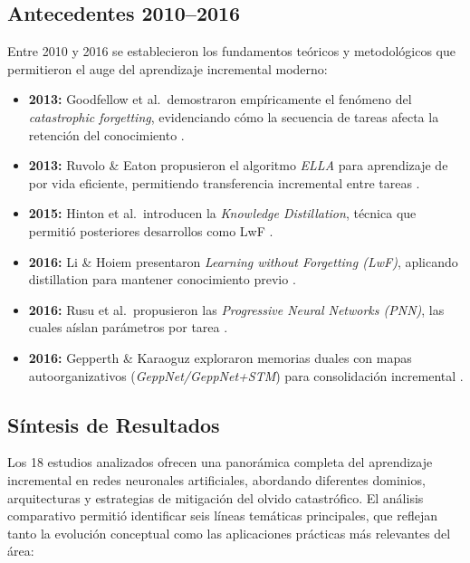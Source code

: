 \documentclass[10pt,a4paper]{article}
\begin{document}
\subsection{Antecedentes 2010–2016}
Entre 2010 y 2016 se establecieron los fundamentos teóricos y metodológicos que permitieron el auge del aprendizaje incremental moderno:
\begin{itemize}
  \item \textbf{2013:} Goodfellow et al.\ demostraron empíricamente el fenómeno del \textit{catastrophic forgetting}, evidenciando cómo la secuencia de tareas afecta la retención del conocimiento \cite{goodfellow2013catastrophic}.
  \item \textbf{2013:} Ruvolo \& Eaton propusieron el algoritmo \textit{ELLA} para aprendizaje de por vida eficiente, permitiendo transferencia incremental entre tareas \cite{ruvolo2013ella}.
  \item \textbf{2015:} Hinton et al.\ introducen la \textit{Knowledge Distillation}, técnica que permitió posteriores desarrollos como LwF \cite{hinton2015distillation}. 
  \item \textbf{2016:} Li \& Hoiem presentaron \textit{Learning without Forgetting (LwF)}, aplicando distillation para mantener conocimiento previo \cite{li2016lwf}.
  \item \textbf{2016:} Rusu et al.\ propusieron las \textit{Progressive Neural Networks (PNN)}, las cuales aíslan parámetros por tarea \cite{rusu2016pnn}.
  \item \textbf{2016:} Gepperth \& Karaoguz exploraron memorias duales con mapas autoorganizativos (\textit{GeppNet/GeppNet+STM}) para consolidación incremental \cite{gepperth2016geppnet}.
\end{itemize}

\subsection{Síntesis de Resultados}
Los 18 estudios analizados ofrecen una panorámica completa del aprendizaje incremental en redes neuronales artificiales, abordando diferentes dominios, arquitecturas y estrategias de mitigación del olvido catastrófico. 
El análisis comparativo permitió identificar seis líneas temáticas principales, que reflejan tanto la evolución conceptual como las aplicaciones prácticas más relevantes del área:
\end{document}
